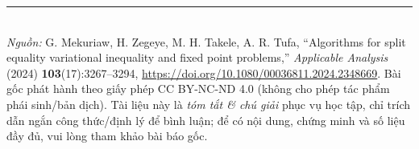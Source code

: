 \documentclass{MyBook}
\theoremstyle{plain}
\theoremstyle{definition}
\begin{document}
\vfill
\noindent\rule{\linewidth}{0.4pt}\\[2pt]
{\footnotesize\textit{Nguồn:} G. Mekuriaw, H. Zegeye, M. H. Takele, A. R. Tufa, ``Algorithms for split equality variational inequality and fixed point problems,'' \textit{Applicable Analysis} (2024) \textbf{103}(17):3267--3294, \url{https://doi.org/10.1080/00036811.2024.2348669}. Bài gốc phát hành theo giấy phép CC BY-NC-ND 4.0 (không cho phép tác phẩm phái sinh/bản dịch). Tài liệu này là \emph{tóm tắt \& chú giải} phục vụ học tập, chỉ trích dẫn ngắn công thức/định lý để bình luận; để có nội dung, chứng minh và số liệu đầy đủ, vui lòng tham khảo bài báo gốc.}
\end{document}
